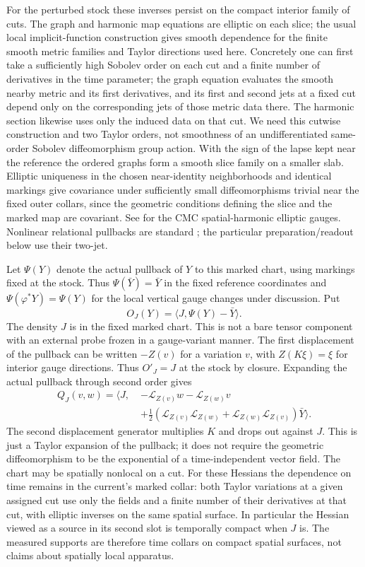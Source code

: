\documentclass[11pt]{article}
\newcommand{\Lie}{\mathcal L}
\numberwithin{equation}{section}
\begin{document}
For the perturbed stock these inverses persist on
the compact interior family of cuts. The graph and harmonic
map equations are elliptic on each slice; the usual local
implicit-function construction gives smooth dependence for
the finite smooth metric families and Taylor directions used
here. Concretely one can first take a sufficiently high
Sobolev order on each cut and a finite number of derivatives
in the time parameter; the graph equation evaluates the
smooth nearby metric and its first derivatives, and its
first and second jets at a fixed cut depend only on the
corresponding jets of those metric data there. The harmonic
section likewise uses only the induced data on that cut.
We need this cutwise construction and two Taylor orders,
not smoothness of an undifferentiated same-order Sobolev
diffeomorphism group action. With the sign of the lapse
kept near the reference the ordered graphs form a smooth
slice family on a smaller slab. Elliptic uniqueness in the
chosen near-identity neighborhoods and identical markings
give covariance under sufficiently small diffeomorphisms
trivial near the fixed outer collars, since the geometric
conditions defining the slice and the marked map are
covariant. See \cite{am} for the CMC spatial-harmonic
elliptic gauges. Nonlinear relational pullbacks are
standard \cite{relational}; the particular
preparation/readout below use their two-jet.

Let \(\Psi(Y)\) denote the actual pullback of \(Y\) to
this marked chart, using markings fixed at the stock.
Thus \(\Psi(\bar Y)=\bar Y\) in the fixed reference
coordinates and \(\Psi(\varphi^*Y)=\Psi(Y)\) for the
local vertical gauge changes under discussion. Put
\[
 O_J(Y)=\langle J,\Psi(Y)-\bar Y\rangle .
\]
The density \(J\) is in the fixed marked chart. This is
not a bare tensor component with an external probe frozen
in a gauge-variant manner. The first displacement of the
pullback can be written \(-Z(v)\) for a variation \(v\),
with \(Z(K\xi)=\xi\) for interior gauge directions.
Thus \(O'_J=J\) at the stock by closure. Expanding the
actual pullback through second order gives
\begin{align}
 Q_J(v,w)=\big\langle J,\;&-\Lie_{Z(v)}w-\Lie_{Z(w)}v
 \nonumber\\
  &+\tfrac12
      (\Lie_{Z(v)}\Lie_{Z(w)}+\Lie_{Z(w)}\Lie_{Z(v)})
                                                \bar Y\big\rangle .
 \label{eq:hessian}
\end{align}
The second displacement generator multiplies \(K\) and
drops out against \(J\). This is just a Taylor expansion
of the pullback; it does not require the geometric
diffeomorphism to be the exponential of a time-independent
vector field. The chart may be spatially nonlocal on a
cut. For these Hessians the dependence on time remains in
the current's marked collar: both Taylor variations at a
given assigned cut use only the fields and a finite number
of their derivatives at that cut, with elliptic inverses
on the same spatial surface. In particular the Hessian
viewed as a source in its second slot is temporally compact
when \(J\) is. The measured supports are therefore
time collars on compact spatial surfaces, not claims about
spatially local apparatus.
\end{document}

